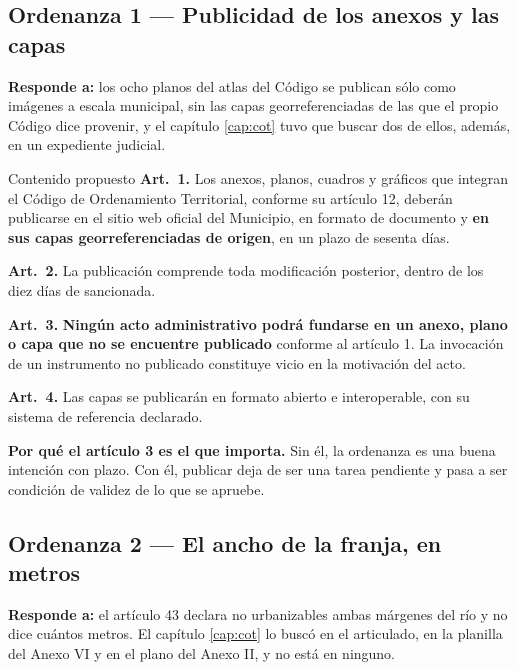 \subsection{Ordenanza 1 --- Publicidad de los anexos y las capas}

\textbf{Responde a:} los ocho planos del atlas del Código se publican sólo como imágenes a escala municipal, sin las capas georreferenciadas de las que el propio Código dice provenir, y el capítulo \ref{cap:cot} tuvo que buscar dos de ellos, además, en un expediente judicial.

\begin{ficha}{Contenido propuesto}
\textbf{Art.\ 1.} Los anexos, planos, cuadros y gráficos que integran el Código de
Ordenamiento Territorial, conforme su artículo 12, deberán publicarse en el sitio web oficial
del Municipio, en formato de documento y \textbf{en sus capas georreferenciadas de origen}, en
un plazo de sesenta días.

\textbf{Art.\ 2.} La publicación comprende toda modificación posterior, dentro de los diez
días de sancionada.

\textbf{Art.\ 3.} \textbf{Ningún acto administrativo podrá fundarse en un anexo, plano o capa
que no se encuentre publicado} conforme al artículo 1. La invocación de un instrumento no
publicado constituye vicio en la motivación del acto.

\textbf{Art.\ 4.} Las capas se publicarán en formato abierto e interoperable, con su sistema
de referencia declarado.
\end{ficha}

\textbf{Por qué el artículo 3 es el que importa.} Sin él, la ordenanza es una buena intención
con plazo. Con él, publicar deja de ser una tarea pendiente y pasa a ser condición de validez
de lo que se apruebe.

\subsection{Ordenanza 2 --- El ancho de la franja, en metros}

\textbf{Responde a:} el artículo 43 declara no urbanizables ambas márgenes del río y no dice
cuántos metros. El capítulo \ref{cap:cot} lo buscó en el articulado, en la planilla del Anexo
VI y en el plano del Anexo II, y no está en ninguno.

